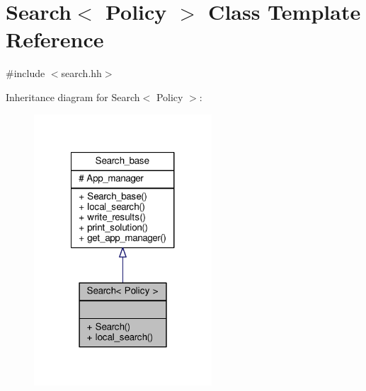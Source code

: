 \hypertarget{classSearch}{\section{Search$<$ Policy $>$ Class Template Reference}
\label{classSearch}
}


{\ttfamily \#include $<$search.\-hh$>$}



Inheritance diagram for Search$<$ Policy $>$\-:
\nopagebreak
\begin{figure}[H]
\begin{center}
\leavevmode
\includegraphics[width=188pt]{classSearch__inherit__graph}
\end{center}
\end{figure}


